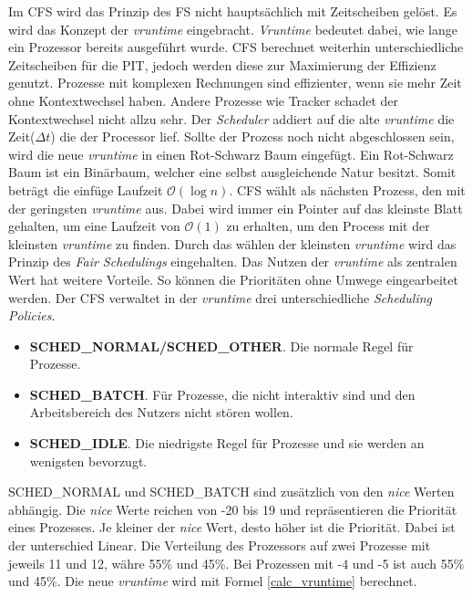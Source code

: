 Im CFS wird das Prinzip des FS nicht hauptsächlich mit Zeitscheiben gelöst. Es wird das Konzept der \textit{vruntime} eingebracht. \textit{Vruntime} bedeutet dabei, wie lange ein Prozessor bereits ausgeführt wurde. CFS berechnet weiterhin unterschiedliche Zeitscheiben für die PIT, jedoch werden diese zur Maximierung der Effizienz genutzt. Prozesse mit komplexen Rechnungen sind effizienter, wenn sie mehr Zeit ohne Kontextwechsel haben. Andere Prozesse wie Tracker schadet der Kontextwechsel nicht allzu sehr. Der \textit{Scheduler} addiert auf die alte \textit{vruntime} die Zeit($\Delta t$) die der Processor lief. Sollte der Prozess noch nicht abgeschlossen sein, wird die neue \textit{vruntime} in einen Rot-Schwarz Baum eingefügt. Ein Rot-Schwarz Baum ist ein Binärbaum, welcher eine selbst ausgleichende Natur besitzt. Somit beträgt die einfüge Laufzeit $\mathcal{O}(\log n)$. CFS wählt als nächsten Prozess, den mit der geringsten \textit{vruntime} aus. Dabei wird immer ein Pointer auf das kleinste Blatt gehalten, um eine Laufzeit von $\mathcal{O}(1)$ zu erhalten, um den Process mit der kleinsten \textit{vruntime} zu finden. Durch das wählen der kleinsten \textit{vruntime} wird das Prinzip des \textit{Fair Schedulings} eingehalten. \cite{CFS:Rebeiro}
\medskip
\newpage
Das Nutzen der \textit{vruntime} als zentralen Wert hat weitere Vorteile. So können die Prioritäten ohne Umwege eingearbeitet werden. Der CFS verwaltet in der \textit{vruntime} drei unterschiedliche \textit{Scheduling Policies}. \cite{LinuxDoc:Torvalds}
\begin{itemize}
    \item \textbf{SCHED\_NORMAL/SCHED\_OTHER}. Die normale Regel für Prozesse.
    \item \textbf{SCHED\_BATCH}. Für Prozesse, die nicht interaktiv sind und den Arbeitsbereich des Nutzers nicht stören wollen.
    \item \textbf{SCHED\_IDLE}. Die niedrigste Regel für Prozesse und sie werden an wenigsten bevorzugt.
\end{itemize}
SCHED\_NORMAL und SCHED\_BATCH sind zusätzlich von den \textit{nice} Werten abhängig. Die \textit{nice} Werte reichen von -20 bis 19 und repräsentieren die Priorität eines Prozesses. Je kleiner der \textit{nice} Wert, desto höher ist die Priorität\cite{Scheduler:Kerrisk}. Dabei ist der unterschied Linear. Die Verteilung des Prozessors auf zwei Prozesse mit jeweils 11 und 12, währe 55\% und 45\%. Bei Prozessen mit -4 und -5 ist auch 55\% und 45\%. Die neue \textit{vruntime} wird mit Formel \ref{calc_vruntime}\cite{LinuxKernel:Torvalds} berechnet.
